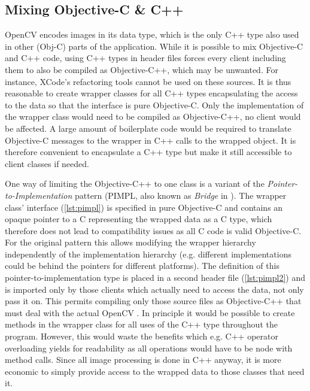 \subsection{Mixing Objective-C \& C++}

OpenCV encodes images in its  data type, which is the only C++ type
also used in other (Obj-C) parts of the application.  While it is possible to
mix Objective-C and C++ code, using C++ types in header files forces every
client including them to also be compiled as Objective-C++, which may be
unwanted. For instance, XCode's refactoring tools cannot be used on these
sources. It is thus reasonable to create wrapper classes for all C++ types
encapsulating the access to the data so that the interface is pure Objective-C.
Only the implementation of the wrapper class would need to be compiled as
Objective-C++, no client would be affected. A large amount of boilerplate code would
be required to translate Objective-C messages to the wrapper in C++ calls to the
wrapped object.  It is therefore convenient to encapsulate a C++ type but make
it still accessible to client classes if needed. 

One way of limiting the Objective-C++ to one class is a variant of the
\emph{Pointer-to-Implementation} pattern (PIMPL, also known as \emph{Bridge} in
\citep{gamma1995}). The wrapper class' interface (\autoref{lst:pimpl}) is
specified in pure Objective-C and contains an opaque pointer to a C
 representing the wrapped data as a C type, which therefore does not
lead to compatibility issues as all C code is valid Objective-C. For the
original pattern this allows modifying the wrapper hierarchy independently of
the implementation hierarchy (e.g. different implementations could be behind the
pointers for different platforms). The definition of this
pointer-to-implementation type is placed in a second header file
(\autoref{lst:pimpl2}) and is imported only by those clients which actually need
to access the data, not only pass it on. This permits compiling only those
source files as Objective-C++ that must deal with the actual OpenCV .
In principle it would be possible to create methods in the wrapper class for
all uses of the C++ type throughout the program. However, this would waste the
benefits which e.g. C++ operator overloading yields for readability as all
operations would have to be node with method calls. Since all
image processing is done in C++ anyway, it is more economic to simply provide
access to the wrapped data to those classes that need it.

